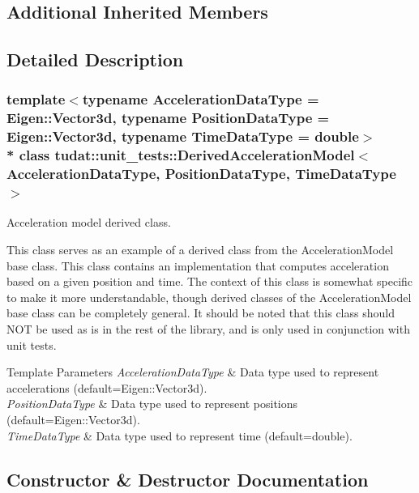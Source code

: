 \subsection*{Additional Inherited Members}


\subsection{Detailed Description}
\subsubsection*{template$<$typename Acceleration\+Data\+Type = Eigen\+::\+Vector3d, typename Position\+Data\+Type = Eigen\+::\+Vector3d, typename Time\+Data\+Type = double$>$\\*
class tudat\+::unit\+\_\+tests\+::\+Derived\+Acceleration\+Model$<$ Acceleration\+Data\+Type, Position\+Data\+Type, Time\+Data\+Type $>$}

Acceleration model derived class. 

This class serves as an example of a derived class from the Acceleration\+Model base class. This class contains an implementation that computes acceleration based on a given position and time. The context of this class is somewhat specific to make it more understandable, though derived classes of the Acceleration\+Model base class can be completely general. It should be noted that this class should N\+OT be used as is in the rest of the library, and is only used in conjunction with unit tests. 
\begin{DoxyTemplParams}{Template Parameters}
{\em Acceleration\+Data\+Type} & Data type used to represent accelerations (default=Eigen\+::\+Vector3d). \\
\hline
{\em Position\+Data\+Type} & Data type used to represent positions (default=Eigen\+::\+Vector3d). \\
\hline
{\em Time\+Data\+Type} & Data type used to represent time (default=double). \\
\hline
\end{DoxyTemplParams}


\subsection{Constructor \& Destructor Documentation}
